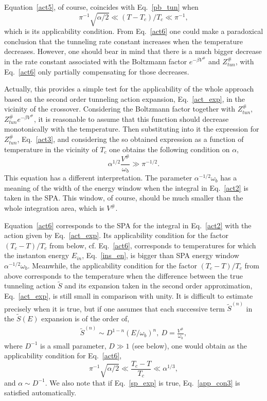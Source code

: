 \documentclass[journal=jpcafh,manuscript=article]{achemso}
\begin{document}
 Equation~\ref{act5}, of course, coincides with Eq.~\ref{pb_tun}
 when
 \begin{equation}
   \label{app_con1}
 \pi^{-1}\sqrt{\alpha/2}\ll(T-T_c)/T_c\ll\pi^{-1},
\end{equation}
which is its applicability condition.  From Eq.~\ref{act6} one could
make a paradoxical conclusion that the tunneling rate constant
increases when the temperature decreases. However, one should bear in
mind that there is a much bigger decrease in the rate constant
associated with the Boltzmann factor $e^{-\beta V^\#}$ and
$Z^\#_{tun}$, with Eq.~\ref{act6} only partially compensating for
those decreases.

Actually, this provides a simple test for the applicability of the whole
approach based on the second order tunneling action expansion,
Eq.~\ref{act_exp}, in the vicinity of the crossover. Considering the
Boltzmann factor together with $Z^\#_{tun}$,
$Z^\#_{tun}e^{-\beta V^\#}$, it is reasonable to assume that this
function should decrease monotonically with the temperature.  Then
substituting into it the expression for $Z^\#_{tun}$, Eq.~\ref{act3},
and considering the so obtained expression as a function of
temperature in the vicinity of $T_c$ one obtains the following
condition on $\alpha$,
\begin{equation}
  \label{app_con3}
  \alpha^{1/2}\frac{V^\#}{\omega_b}\gg\pi^{-1/2}.
\end{equation}
This equation has a different interpretation. The parameter
$\alpha^{-1/2}\omega_b$ has a meaning of the width of the energy
window when the integral in Eq.~\ref{act2} is taken in the SPA. This
window, of course, should be much smaller than the whole integration
area, which is $V^\#$.

Equation~\ref{act6} corresponds to the SPA for the integral in
Eq.~\ref{act2} with the action given by Eq.~\ref{act_exp}. Its
applicability condition for the factor $(T_c-T)/T_c$ from below, cf.
Eq.~\ref{act6}, corresponds to temperatures for which the instanton
energy $E_{in}$, Eq.~\ref{ins_en}, is bigger than SPA energy window
$\alpha^{-1/2}\omega_b$. Meanwhile, the applicability condition for
the factor $(T_c-T)/T_c$ from above corresponds to the temperature
when the difference between the true tunneling action $\tilde{S}$ and
its expansion taken in the second order approximation,
Eq.~\ref{act_exp}, is still small in comparison with unity.  It is
difficult to estimate precisely when it is true, but if one assumes
that each successive term $\tilde{S}^{(n)}$ in the $\tilde{S}(E)$
expansion is of the order of,
\begin{eqnarray}
  \label{sp_exp}
  \tilde{S}^{(n)}\sim D^{1-n}(E/\omega_b)^n,\ D=\frac{V^\#}{\omega_b},
\end{eqnarray}
where $D^{-1}$ is a small parameter, $D\gg 1$ (see below), one would
obtain as the applicability condition for Eq.~\ref{act6},
\begin{equation}
  \label{app_con2}
  \pi^{-1}\sqrt{\alpha/2}\ll \frac{T_c-T}{T_c}\ll \alpha^{1/3},
\end{equation}
and $\alpha\sim D^{-1}$. We also note that if Eq.~\ref{sp_exp} is true,
Eq.~\ref{app_con3} is satisfied automatically.
\end{document}
